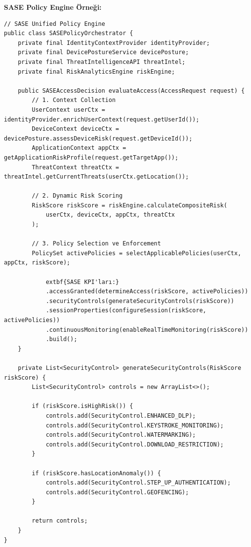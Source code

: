 \textbf{SASE Policy Engine Örneği:}
\begin{lstlisting}[breaklines=true,basicstyle=\ttfamily\small]
// SASE Unified Policy Engine
public class SASEPolicyOrchestrator {
    private final IdentityContextProvider identityProvider;
    private final DevicePostureService devicePosture;
    private final ThreatIntelligenceAPI threatIntel;
    private final RiskAnalyticsEngine riskEngine;
    
    public SASEAccessDecision evaluateAccess(AccessRequest request) {
        // 1. Context Collection
        UserContext userCtx = identityProvider.enrichUserContext(request.getUserId());
        DeviceContext deviceCtx = devicePosture.assessDeviceRisk(request.getDeviceId());
        ApplicationContext appCtx = getApplicationRiskProfile(request.getTargetApp());
        ThreatContext threatCtx = threatIntel.getCurrentThreats(userCtx.getLocation());
        
        // 2. Dynamic Risk Scoring
        RiskScore riskScore = riskEngine.calculateCompositeRisk(
            userCtx, deviceCtx, appCtx, threatCtx
        );
        
        // 3. Policy Selection ve Enforcement
        PolicySet activePolicies = selectApplicablePolicies(userCtx, appCtx, riskScore);
        
        	extbf{SASE KPI'ları:}
            .accessGranted(determineAccess(riskScore, activePolicies))
            .securityControls(generateSecurityControls(riskScore))
            .sessionProperties(configureSession(riskScore, activePolicies))
            .continuousMonitoring(enableRealTimeMonitoring(riskScore))
            .build();
    }
    
    private List<SecurityControl> generateSecurityControls(RiskScore riskScore) {
        List<SecurityControl> controls = new ArrayList<>();
        
        if (riskScore.isHighRisk()) {
            controls.add(SecurityControl.ENHANCED_DLP);
            controls.add(SecurityControl.KEYSTROKE_MONITORING);
            controls.add(SecurityControl.WATERMARKING);
            controls.add(SecurityControl.DOWNLOAD_RESTRICTION);
        }
        
        if (riskScore.hasLocationAnomaly()) {
            controls.add(SecurityControl.STEP_UP_AUTHENTICATION);
            controls.add(SecurityControl.GEOFENCING);
        }
        
        return controls;
    }
}
\end{lstlisting}


